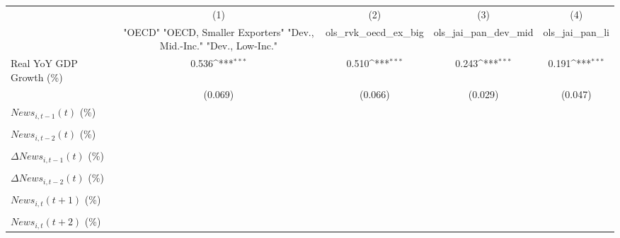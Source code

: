 {
\def\sym#1{\ifmmode^{#1}\else\(^{#1}\)\fi}
\begin{tabular}{l*{4}{c}}
\toprule
                    &\multicolumn{1}{c}{(1)}&\multicolumn{1}{c}{(2)}&\multicolumn{1}{c}{(3)}&\multicolumn{1}{c}{(4)}\\
                    &\multicolumn{1}{c}{ "OECD" "OECD, Smaller Exporters" "Dev., Mid.-Inc." "Dev., Low-Inc."}&\multicolumn{1}{c}{ols_rvk_oecd_ex_big}&\multicolumn{1}{c}{ols_jai_pan_dev_mid}&\multicolumn{1}{c}{ols_jai_pan_li}\\
\midrule
Real YoY GDP Growth (\%)&       0.536\sym{***}&       0.510\sym{***}&       0.243\sym{***}&       0.191\sym{***}\\
                    &     (0.069)         &     (0.066)         &     (0.029)         &     (0.047)         \\
\addlinespace
$ News_{i,t-1}(t)$ (\%)&                     &                     &                     &                     \\
                    &                     &                     &                     &                     \\
\addlinespace
$ News_{i,t-2}(t)$ (\%)&                     &                     &                     &                     \\
                    &                     &                     &                     &                     \\
\addlinespace
$ \Delta News_{i,t-1}(t)$ (\%)&                     &                     &                     &                     \\
                    &                     &                     &                     &                     \\
\addlinespace
$ \Delta News_{i,t-2}(t)$ (\%)&                     &                     &                     &                     \\
                    &                     &                     &                     &                     \\
\addlinespace
$ News_{i,t}(t+1)$ (\%)&                     &                     &                     &                     \\
                    &                     &                     &                     &                     \\
\addlinespace
$ News_{i,t}(t+2)$ (\%)&                     &                     &                     &                     \\

\end{tabular}}
